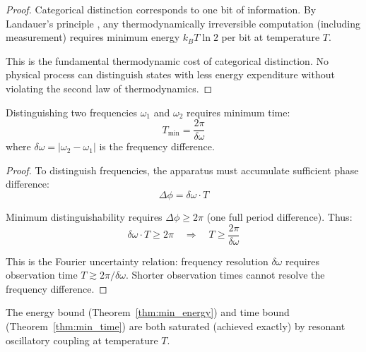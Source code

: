\begin{proof}
Categorical distinction corresponds to one bit of information. By Landauer's principle \citep{landauer1961irreversibility}, any thermodynamically irreversible computation (including measurement) requires minimum energy $k_B T \ln 2$ per bit at temperature $T$.

This is the fundamental thermodynamic cost of categorical distinction. No physical process can distinguish states with less energy expenditure without violating the second law of thermodynamics.
\end{proof}

\begin{theorem}
\label{thm:min_time}
Distinguishing two frequencies $\omega_1$ and $\omega_2$ requires minimum time:
\begin{equation}
T_{\min} = \frac{2\pi}{\delta\omega}
\end{equation}
where $\delta\omega = |\omega_2 - \omega_1|$ is the frequency difference.
\end{theorem}

\begin{proof}
To distinguish frequencies, the apparatus must accumulate sufficient phase difference:
\begin{equation}
\Delta\phi = \delta\omega \cdot T
\end{equation}

Minimum distinguishability requires $\Delta\phi \geq 2\pi$ (one full period difference). Thus:
\begin{equation}
\delta\omega \cdot T \geq 2\pi \quad \Rightarrow \quad T \geq \frac{2\pi}{\delta\omega}
\end{equation}

This is the Fourier uncertainty relation: frequency resolution $\delta\omega$ requires observation time $T \gtrsim 2\pi/\delta\omega$. Shorter observation times cannot resolve the frequency difference.
\end{proof}

\begin{corollary}
\label{cor:bound_saturation}
The energy bound (Theorem~\ref{thm:min_energy}) and time bound (Theorem~\ref{thm:min_time}) are both saturated (achieved exactly) by resonant oscillatory coupling at temperature $T$.
\end{corollary}

